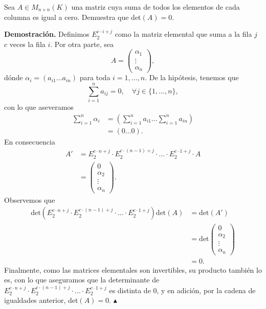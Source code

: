 \documentclass[11pt]{scrartcl}
\begin{document}
\newpage
\begin{mdframed}[style=mdpurplebox, frametitle={Ejercicio 3, Tarea 01, Álgebra Lineal II}]
    Sea $A \in M_{n\times n}(K)$ una matriz cuya suma de todos los elementos de cada columna es igual a cero.
    Demuestra que det$(A)=0$.
\end{mdframed}
\textbf{Demostración.} Definimos $E_{2}^{c\cdot i + j}$ como la matriz elemental que suma a la fila $j$ $c$ veces la fila $i$.
Por otra parte, sea
\begin{equation*}
    A=
    \begin{pmatrix}
        \alpha_1 \\
        \vdots \\
        \alpha_n
    \end{pmatrix},
\end{equation*}
dónde $\alpha_i=(a_{i1}\dots a_{in})$ para toda $i=1,\dots,n$.
De la hipótesis, tenemos que
\begin{equation*}
    \sum_{i=1}^{n}a_{ij}=0, \quad \forall j\in \{1,...,n\},
\end{equation*}
con lo que aseveramos
\begin{align*}
    \sum_{i=1}^{n}\alpha_i &= \left(\sum_{i=1}^{n}a_{i1}\dots \sum_{i=1}^{n}a_{in}\right) \\
    &= \left(0\dots 0\right).
\end{align*}
En consecuencia
\begin{align*}
    A' &= E_{2}^{c\cdot n + j}\cdot E_{2}^{c\cdot (n-1) + j} \cdot ... \cdot E_{2}^{c\cdot 1 + j}\cdot A \\
    &=
    \begin{pmatrix}
        0 \\
        \alpha_2 \\
        \vdots \\
        \alpha_n
    \end{pmatrix}.
\end{align*}
Observemos que
\begin{align*}
    \text{det}\left(E_{2}^{c\cdot n + j}\cdot E_{2}^{c\cdot (n-1) + j} \cdot ... \cdot E_{2}^{c\cdot 1 + j}\right)\text{det}\left(A\right) &= \text{det}\left(A'\right) \\
    &=\text{det}
    \begin{pmatrix}
        0 \\
        \alpha_2 \\
        \vdots \\
        \alpha_n
    \end{pmatrix} \\
    &=0.
\end{align*}
Finalmente, como las matrices elementales son invertibles, su producto también lo es, con lo que aseguramos que la determinante de $E_{2}^{c\cdot n + j}\cdot E_{2}^{c\cdot (n-1) + j} \cdot ... \cdot E_{2}^{c\cdot 1 + j}$
es distinta de 0, y en adición, por la cadena de igualdades anterior, det$(A)=0$. \hfill $\blacktriangle$
\end{document}
